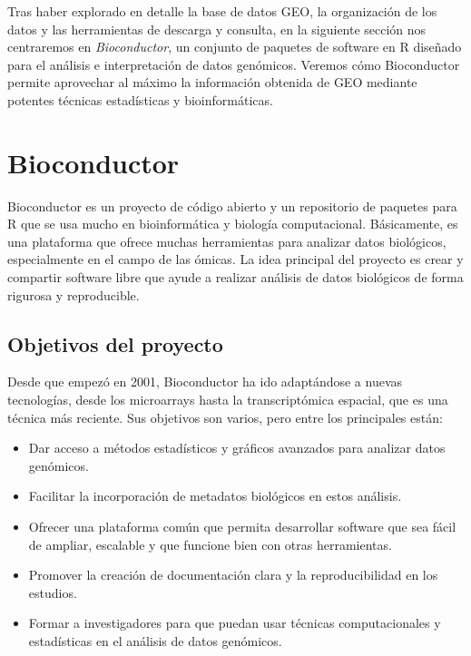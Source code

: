 Tras haber explorado en detalle la base de datos GEO, la organización de los datos y las herramientas de descarga y consulta, en la siguiente sección nos centraremos en \textit{Bioconductor}, un conjunto de paquetes de software en R 
diseñado para el análisis e interpretación de datos genómicos. Veremos cómo Bioconductor permite aprovechar al máximo la información obtenida de GEO mediante potentes técnicas estadísticas y bioinformáticas.

\newpage

\chapter{Bioconductor}  %


Bioconductor es un proyecto de código abierto y un repositorio de paquetes para R que se usa mucho en bioinformática y biología computacional. 
Básicamente, es una plataforma que ofrece muchas herramientas para analizar datos biológicos, especialmente en el campo de las ómicas. 
La idea principal del proyecto es crear y compartir software libre que ayude a realizar análisis de datos biológicos de forma rigurosa y reproducible.

\section{Objetivos del proyecto}

Desde que empezó en 2001, Bioconductor ha ido adaptándose a nuevas tecnologías, desde los microarrays hasta la transcriptómica espacial, que 
es una técnica más reciente. Sus objetivos son varios, pero entre los principales están:

\begin{itemize}
\item Dar acceso a métodos estadísticos y gráficos avanzados para analizar datos genómicos.
\item Facilitar la incorporación de metadatos biológicos en estos análisis.
\item Ofrecer una plataforma común que permita desarrollar software que sea fácil de ampliar, escalable y que funcione bien con otras herramientas.
\item Promover la creación de documentación clara y la reproducibilidad en los estudios.
\item Formar a investigadores para que puedan usar técnicas computacionales y estadísticas en el análisis de datos genómicos.
\end{itemize}

